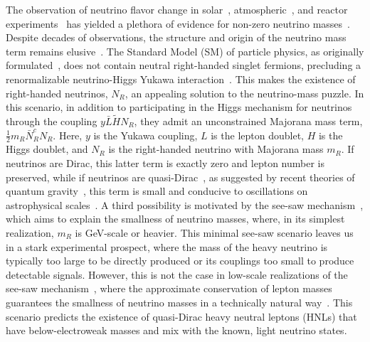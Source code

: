 \documentclass[
    aps,
    prd,
    reprint,
    amsmath,
    amssymb,
    nofootinbib,
    linenumbers,
    superscriptaddress,
    floatfix
]{revtex4-2}
\begin{document}
The observation of neutrino flavor change in solar~\cite{Cleveland:1998nv, Super-Kamiokande:2001ljr, Borexino:2008dzn, Gann:2021ndb}, atmospheric~\cite{Super-Kamiokande:1998kpq, IceCube:2013pav, ANTARES:2018rtf, IceCubeCollaboration:2023wtb, Arguelles:2022hrt}, and reactor experiments~\cite{DayaBay:2012fng, RENO:2012mkc, Vogel:2015wua} has yielded a plethora of evidence for non-zero neutrino masses~\cite{Esteban:2018azc}.
Despite decades of observations, the structure and origin of the neutrino mass term remains elusive~\cite{Mohapatra:2005wg}.
The Standard Model (SM) of particle physics, as originally formulated~\cite{Weinberg:1967tq, Weinberg:2004kv}, does not contain neutral right-handed singlet fermions, precluding a renormalizable neutrino-Higgs Yukawa interaction~\cite{Higgs:1964pj}.
This makes the existence of right-handed neutrinos, $N_R$, an appealing solution to the neutrino-mass puzzle.
In this scenario, in addition to participating in the Higgs mechanism for neutrinos through the coupling $y \bar L \tilde H N_R$, they admit an unconstrained Majorana mass term, $\frac{1}{2} m_R \bar N_R^c N_R$.
Here, $y$ is the Yukawa coupling, $L$ is the lepton doublet, $H$ is the Higgs doublet, and $N_R$ is the right-handed neutrino with Majorana mass $m_R$.
If neutrinos are Dirac, this latter term is exactly zero and lepton number is preserved, while if neutrinos are quasi-Dirac~\cite{Valle:1983dk}, as suggested by recent theories of quantum gravity~\cite{Ooguri:2016pdq, Arkani-Hamed:2007ryu, Gonzalo:2021zsp, Vafa:2024fpx}, this term is small and conducive to oscillations on astrophysical scales~\cite{Crocker:2001zs, Keranen:2003xd,Beacom:2003eu, Esmaili:2009fk, Esmaili:2012ac, Shoemaker:2015qul, Carloni:2022cqz}.
A third possibility is motivated by the see-saw mechanism~\cite{Minkowski:1977sc, Mohapatra:1979ia, GellMann:1980vs, Yanagida:1979as, Lazarides:1980nt, Mohapatra:1980yp, Schechter:1980gr, Cheng:1980qt, Foot:1988aq}, which aims to explain the smallness of neutrino masses, where, in its simplest realization, $m_R$ is GeV-scale or heavier.
This minimal see-saw scenario leaves us in a stark experimental prospect, where the mass of the heavy neutrino is typically too large to be directly produced or its couplings too small to produce detectable signals.
However, this is not the case in low-scale realizations of the see-saw mechanism~\cite{Mohapatra:1986bd, GonzalezGarcia:1988rw,Wyler:1982dd, Akhmedov:1995ip, Akhmedov:1995vm,Barry:2011wb, Zhang:2011vh}, where the approximate conservation of lepton masses guarantees the smallness of neutrino masses in a technically natural way~\cite{naturalness_tHooft, Vissani:1997ys}.
This scenario predicts the existence of quasi-Dirac heavy neutral leptons (HNLs) that have below-electroweak masses and mix with the known, light neutrino states.
\end{document}
